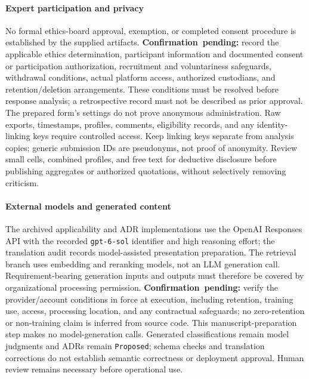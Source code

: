 \paragraph{Expert participation and privacy}
No formal ethics-board approval, exemption, or completed consent procedure is
established by the supplied artifacts. \mbox{\textbf{Confirmation pending:}}
record the applicable ethics determination, participant information and
documented consent or participation authorization, recruitment and
voluntariness safeguards, withdrawal conditions, actual platform access,
authorized custodians, and retention/deletion arrangements. These conditions
must be resolved before response analysis; a retrospective record must not
be described as prior approval. The prepared form's settings do not prove
anonymous administration. Raw exports, timestamps, profiles, comments,
eligibility records, and any identity-linking keys require controlled access.
Keep linking keys separate from analysis copies; generic submission IDs
are pseudonyms, not proof of anonymity. Review small cells, combined
profiles, and free text for deductive disclosure before publishing
aggregates or authorized quotations, without selectively removing criticism.

\paragraph{External models and generated content}
The archived applicability and ADR implementations use the OpenAI Responses
API with the recorded \texttt{gpt-6-sol} identifier and high reasoning effort;
the translation audit records model-assisted presentation preparation.
The retrieval branch uses embedding and reranking models, not an LLM
generation call. Requirement-bearing generation inputs and outputs must
therefore be covered by organizational processing permission.
\mbox{\textbf{Confirmation pending:}} verify the provider/account conditions in
force at execution, including retention, training use, access, processing
location, and any contractual safeguards; no zero-retention or
non-training claim is inferred from source code. This manuscript-preparation
step makes no model-generation calls. Generated classifications remain model
judgments and ADRs remain \texttt{Proposed}; schema checks and translation
corrections do not establish semantic correctness or deployment approval.
Human review remains necessary before operational use.

